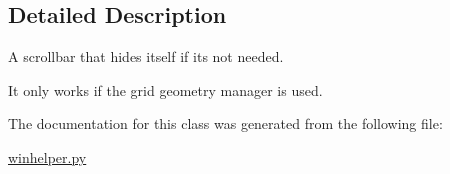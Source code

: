 \subsection{Detailed Description}
A scrollbar that hides itself if it\textquotesingle{}s not needed. 

It only works if the grid geometry manager is used. 

The documentation for this class was generated from the following file\+:\begin{DoxyCompactItemize}
\item 
\hyperlink{winhelper_8py}{winhelper.\+py}\end{DoxyCompactItemize}
